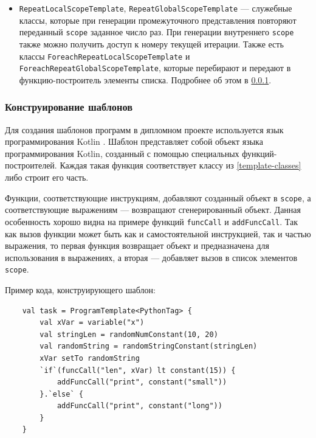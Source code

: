 \begin{itemize}
    \item \texttt{RepeatLocalScopeTemplate}, \texttt{RepeatGlobalScopeTemplate} ---
          служебные классы, которые при генерации промежуточного представления повторяют
          переданный \texttt{scope} заданное число раз. При генерации внутреннего
          \texttt{scope} также можно получить доступ к номеру текущей итерации.
          Также есть классы \texttt{ForeachRepeatLocalScopeTemplate} и \\
          \texttt{ForeachRepeatGlobalScopeTemplate}, которые перебирают и передают в
          функцию-построитель элементы списка. Подробнее об этом в \ref{template-constuct}.
\end{itemize}

\subsubsection{Конструирование шаблонов} \label{template-constuct}

Для создания шаблонов программ в дипломном проекте используется язык программирования Kotlin \cite{kotlin}.
Шаблон представляет собой объект языка программирования Kotlin, созданный с помощью
специальных функций-построителей. Каждая такая функция соответствует классу из
\ref{template-classes} либо строит его часть.

Функции, соответствующие инструкциям,
добавляют созданный объект в \texttt{scope}, а соответствующие выражениям --- возвращают
сгенерированный объект. Данная особенность хорошо видна на примере функций
\texttt{funcCall} и \texttt{addFuncCall}. Так как вызов функции может быть как и
самостоятельной инструкцией, так и частью выражения, то первая функция возвращает объект
и предназначена для использования в выражениях, а вторая --- добавляет вызов в список
элементов \texttt{scope}.

Пример кода, конструирующего шаблон:
\begin{verbatim}
    val task = ProgramTemplate<PythonTag> {
        val xVar = variable("x")
        val stringLen = randomNumConstant(10, 20)
        val randomString = randomStringConstant(stringLen)
        xVar setTo randomString
        `if`(funcCall("len", xVar) lt constant(15)) {
            addFuncCall("print", constant("small"))
        }.`else` {
            addFuncCall("print", constant("long"))
        }
    }
\end{verbatim}

